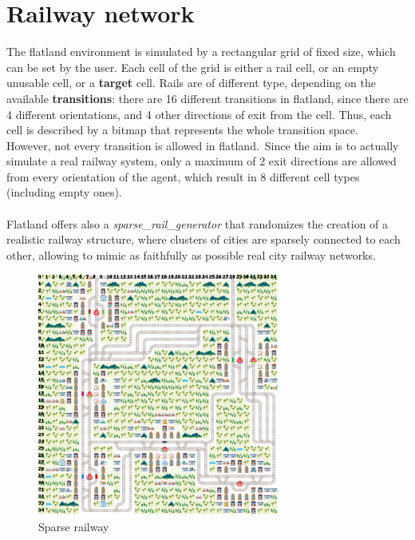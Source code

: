\section{Railway network}
The flatland environment is simulated by a rectangular grid of fixed size, which can be set by the user. Each cell of the grid is either a rail cell, or an empty unusable cell, or a \textbf{target} cell. Rails are of different type, depending on the available \textbf{transitions}: there are 16 different transitions in flatland, since there are 4 different orientations, and 4 other directions of exit from the cell. Thus, each cell is described by a bitmap that represents the whole transition space.\\
However, not every transition is allowed in flatland.\ Since the aim is to actually simulate a real railway system, only a maximum of 2 exit directions are allowed from every orientation of the agent, which result in 8 different cell types (including empty ones).\\ \\
Flatland offers also a \textit{sparse\_rail\_generator} that randomizes the creation of a realistic railway structure, where clusters of cities are sparsely connected to each other, allowing to mimic as faithfully as possible real city railway networks.

\begin{figure}[H] 
\includegraphics[height=80mm, width=80mm, scale=0.5]{chapters/sparse_railway.png}
\centering
\caption{Sparse railway}
\label{fig:s1}
\end{figure}


